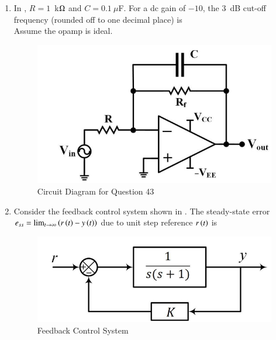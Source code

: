 \documentclass[journal,12pt,onecolumn]{IEEEtran}
\theoremstyle{remark}
\begin{document}
\begin{enumerate}
\item In , $R = 1$~k$\ohm$ and $C=0.1~\mu$F. For a dc gain of $-10$, the $3$~dB cut-off frequency (rounded off to one decimal place) is\\
Assume the opamp is ideal.
\par\hfill{}
\begin{figure}[H]
    \centering
    \includegraphics[width=0.5\columnwidth]{Figs/Q-43.png}
    \caption{Circuit Diagram for Question 43}
    \label{43}
\end{figure}
    \begin{enumerate}
    \end{enumerate}

\item Consider the feedback control system shown in . The steady-state error 
$e_{ss} = \lim_{t \to \infty} \brak{r\brak{t} - y\brak{t}}$ due to unit step reference $r\brak{t}$ is
\par\hfill{}
\begin{figure}[H]
    \centering
    \includegraphics[width=0.5\columnwidth]{Figs/Q-44.png}
    \caption{Feedback Control System}
    \label{44}
\end{figure}
    \begin{enumerate}
    \end{enumerate}


\end{enumerate}
\end{document}
